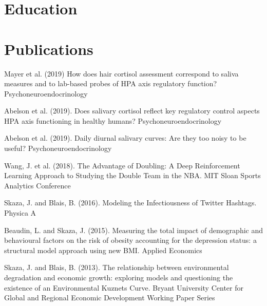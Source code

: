 \documentclass[letterpaper]{twentysecondcv} %
\begin{document}

\section{Education}

\begin{twenty} %

\end{twenty}


\section{Publications}

Mayer et al. (2019) How does hair cortisol assessment correspond to saliva measures and to lab-based probes of HPA axis regulatory function? Psychoneuroendocrinology

Abelson et al. (2019). Does salivary cortisol reflect key regulatory control aspects HPA axis functioning in healthy humans? Psychoneuroendocrinology

Abelson et al. (2019). Daily diurnal salivary curves: Are they too noisy to be useful? Psychoneuroendocrinology

Wang, J. et al. (2018). The Advantage of Doubling: A Deep Reinforcement Learning Approach to Studying the Double Team in the NBA. MIT Sloan Sports Analytics Conference
	
Skaza, J. and Blais, B. (2016). Modeling the Infectiousness of Twitter Hashtags. Physica A
	
Beaudin, L. and Skaza, J. (2015). Measuring the total impact of demographic and behavioural factors on the risk of obesity accounting for the depression status: a structural model approach using new BMI. Applied Economics
	
Skaza, J. and Blais, B. (2013). The relationship between environmental degradation and economic growth: exploring models and questioning the existence of an Environmental Kuznets Curve. Bryant University Center for Global and Regional Economic Development Working Paper Series

\end{document}
